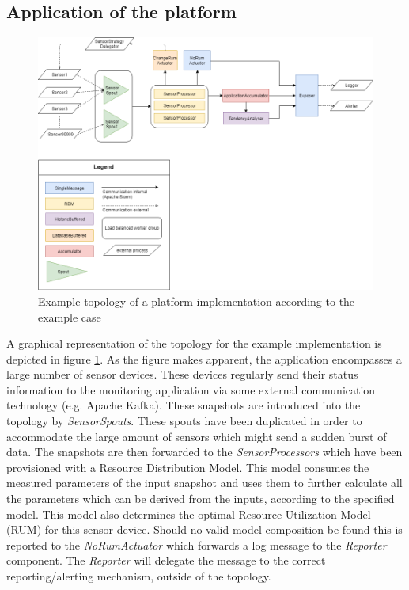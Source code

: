 \subsection{Application of the platform}
\begin{figure}
\centering
\includegraphics[width=\textwidth]{resources/img/example_topology.png}
\caption{Example topology of a platform implementation according to the example case}
\label{fig:example_topology}
\end{figure}
A graphical representation of the topology for the example implementation is depicted in figure \ref{fig:example_topology}. As the figure makes apparent, the application encompasses a large number of sensor devices. These devices regularly send their status information to the monitoring application via some external communication technology (e.g. Apache Kafka). These snapshots are introduced into the topology by \emph{SensorSpouts}. These spouts have been duplicated in order to accommodate the large amount of sensors which might send a sudden burst of data. The snapshots are then forwarded to the \emph{SensorProcessors} which have been provisioned with a Resource Distribution Model. This model consumes the measured parameters of the input snapshot and uses them to further calculate all the parameters which can be derived from the inputs, according to the specified model. This model also determines the optimal Resource Utilization Model (RUM) for this sensor device. Should no valid model composition be found this is reported to the \emph{NoRumActuator} which forwards a log message to the \emph{Reporter} component. The \emph{Reporter} will delegate the message to the correct reporting/alerting mechanism, outside of the topology.

